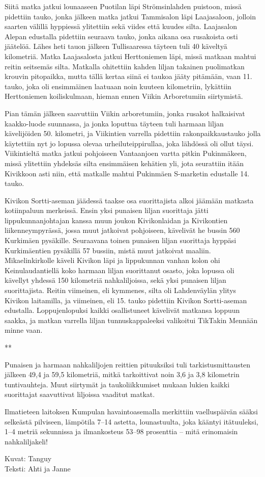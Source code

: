 \begin{multicols}{2}
Siitä matka jatkui lounaaseen Puotilan läpi Strömsinlahden puistoon, missä pidettiin tauko, jonka jälkeen matka jatkui Tammisalon läpi Laajasaloon, jolloin saarten välillä hyppiessä ylitettiin sekä viides että kuudes silta. Laajasalon Alepan edustalla pidettiin seuraava tauko, jonka aikana osa rusakoista osti jäätelöä. Lähes heti tauon jälkeen Tullisaaressa täyteen tuli 40 käveltyä kilometriä. Matka Laajasalosta jatkui Herttoniemen läpi, missä matkaan mahtui reitin seitsemäs silta. Matkalla ohitettiin kahden liljan takainen puolimatkan krouvin pitopaikka, mutta tällä kertaa siinä ei taukoa jääty pitämään, vaan 11. tauko, joka oli ensimmäinen laatuaan noin kuuteen kilometriin, lykättiin Herttoniemen koiliskulmaan, hieman ennen Viikin Arboretumiin siirtymistä.

Pian tämän jälkeen saavuttiin Viikin arboretumiin, jonka rusakot halkaisivat kaakko-luode suunnassa, ja jonka loputtua täyteen tuli harmaan liljan kävelijöiden 50. kilometri, ja Viikintien varrella pidettiin rakonpaikkaustauko jolla käytettiin nyt jo lopussa olevaa urheiluteippirullaa, joka lähdössä oli ollut täysi. Viikintieltä matka jatkui pohjoiseen Vantaanjoen vartta pitkin Pukinmäkeen, missä ylitettiin yhdeksäs silta ensimmäisen kehätien yli, jota seurattiin itään Kivikkoon asti niin, että matkalle mahtui Pukinmäen S-marketin edustalle 14. tauko.

Kivikon Sortti-aseman jäädessä taakse osa suorittajista alkoi jäämään matkasta kotiinpaluun merkeissä. Ensin yksi punaisen liljan suorittaja jätti lippukunnanjohtajan kanssa muun joukon Kivikonlaidan ja Kivikontien liikenneympyrässä, jossa muut jatkoivat pohjoiseen, kävelivät he bussin 560 Kurkimäen pysäkille. Seuraavana toinen punaisen liljan suorittaja hyppäsi Kurkimäentien pysäkillä 57 bussiin, mistä muut jatkoivat maaliin. Mikaelinkirkolle käveli Kivikon läpi ja lippukunnan vanhan kolon ohi Keinulaudantiellä koko harmaan liljan suorittanut osasto, joka lopussa oli kävellyt yhdessä 150 kilometriä nahkaliljoissa, sekä yksi punaisen liljan suorittajista. Reitin viimeinen, eli kymmenes, silta oli Lahdenväylän ylitys Kivikon laitamilla, ja viimeinen, eli 15. tauko pidettiin Kivikon Sortti-aseman edustalla. Loppujenlopuksi kaikki osallistuneet kävelivät matkansa loppuun saakka, ja matkan varrella liljan tunnuskappaleeksi valikoitui TikTakin Mennään minne vaan.

{\smallskip\noindent\centering ***\par\smallskip}

Punaisen ja harmaan nahkaliljojen reittien pituuksiksi tuli tarkistusmittausten 
jälkeen 49,4 ja 59,5 kilometriä, mitkä tarkoittivat noin 3,6 ja 3,8 
kilometrin tuntivauhteja. Muut siirtymät ja taukoliikkumiset mukaan lukien 
kaikki suorittajat saavuttivat liljoissa vaaditut matkat. 

Ilmatieteen laitoksen Kumpulan havaintoasemalla merkittiin vaelluspäivän 
sääksi selkeästä pilviseen, lämpötila 7--14 astetta, lounastuulta, joka 
kääntyi itätuuleksi, 1--4 metriä sekunnissa ja ilmankosteus 53--98 
prosenttia -- mitä erinomaisin nahkaliljakeli!
\end{multicols}

\vfill

\noindent\null\hfill Kuvat: Tanguy\\
\noindent\null\hfill Teksti: Ahti ja Janne
